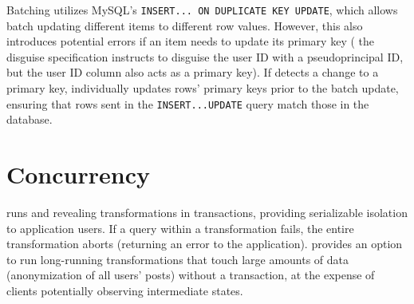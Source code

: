 %
Batching utilizes MySQL's \texttt{INSERT... ON DUPLICATE KEY UPDATE}, which
allows batch updating different items to different row values. However, this
also introduces potential errors if an item needs to update its primary key (\eg
the disguise specification instructs \sys to disguise the user ID with a
pseudoprincipal ID, but the user ID column also acts as a primary key). If \sys
detects a change to a primary key, \sys individually updates rows' primary keys
prior to the batch update, ensuring that rows sent in the
\texttt{INSERT...UPDATE} query match those in the database.

%
\section{Concurrency}
%
\sys runs \xxing and revealing transformations in transactions, providing
serializable isolation to application users.
%
If a query within a transformation fails, the entire transformation aborts
(returning an error to the application).
%
\sys provides an option to run long-running transformations that
touch large amounts of data (\eg anonymization of all users' posts) without a
transaction, at the expense of clients potentially observing intermediate
states.
%


%
%

%

